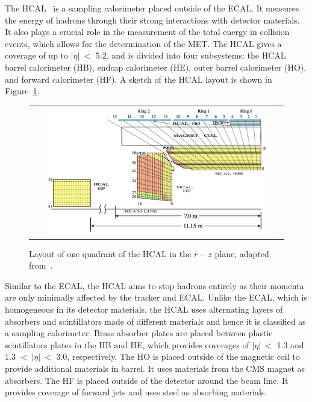 The \ac{HCAL}~\cite{CMS:1997xji} is a sampling calorimeter placed outside of the \ac{ECAL}. It measures the energy of hadrons through their strong interactions with detector materials. It also plays a crucial role in the measurement of the total energy in collision events, which allows for the determination of the \ac{MET}. The \ac{HCAL} gives a coverage of up to $|\eta|~<$ 5.2, and is divided into four subsystems: the \ac{HCAL} barrel calorimeter (HB), endcap calorimeter (HE), outer barrel calorimeter (HO), and forward calorimeter (HF). A sketch of the \ac{HCAL} layout is shown in Figure~\ref{fig:HCAL}.

\begin{figure}[tbh!]
 \begin{center}
 \begin{tabular}{c}
 \includegraphics[width=0.9\textwidth]{figures/Part2/CMS/HCAL}
 \end{tabular}
 \caption{Layout of one quadrant of the \ac{HCAL} in the $r-z$ plane, adapted from~\cite{CMS:2009nwd}.}
 \label{fig:HCAL}
 \end{center}
\end{figure}

Similar to the \ac{ECAL}, the \ac{HCAL} aims to stop hadrons entirely as their momenta are only minimally affected by the tracker and \ac{ECAL}. Unlike the \ac{ECAL}, which is homogeneous in its detector materials, the \ac{HCAL} uses alternating layers of absorbers and scintillators made of different materials and hence it is classified as a sampling calorimeter. Brass absorber plates are placed between plastic scintillators plates in the HB and HE, which provides coverages of $|\eta|~<$ 1.3 and 1.3 $<~|\eta|~<$ 3.0, respectively. The HO is placed outside of the magnetic coil to provide additional materials in barrel. It uses materials from the \ac{CMS} magnet as absorbers. The HF is placed outside of the detector around the beam line. It provides coverage of forward jets and uses steel as absorbing materials. 


